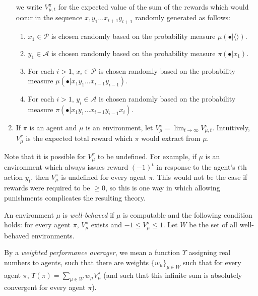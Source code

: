 \documentclass[runningheads]{llncs}
\begin{document}
\begin{definition}
\begin{enumerate}
        we write $V^\pi_{\mu,t}$ for the expected value of the sum of
        the rewards which would occur in the sequence
        $x_1y_1\ldots x_{t+1}y_{t+1}$
        randomly generated as follows:
        \begin{enumerate}
            \item $x_1\in \mathcal P$ is chosen randomly based
            on the probability measure $\mu(\bullet|\langle\rangle)$.
            \item $y_1\in\mathcal A$ is chosen randomly based on the probability
            measure $\pi(\bullet|x_1)$.
            \item
            For each $i>1$,
            $x_i\in\mathcal P$ is chosen randomly based on
            the probability measure
            $\mu(\bullet|x_1y_1\ldots x_{i-1}y_{i-1})$.
            \item
            For each $i>1$,
            $y_i\in\mathcal A$ is chosen randomly based on the probability measure
            $\pi(\bullet|x_1y_1\ldots x_{i-1}y_{i-1}x_i)$.
        \end{enumerate}
        \item
        If $\pi$ is an agent and $\mu$ is an environment,
        let $V^\pi_\mu=\lim_{t\to\infty}V^{\pi}_{\mu,t}$.
        Intuitively, $V^\pi_\mu$ is the expected total reward which $\pi$ would extract
        from $\mu$.
    \end{enumerate}
\end{definition}

Note that it is possible for $V^\pi_\mu$ to be undefined.
For example, if $\mu$ is an environment which always issues
reward $(-1)^t$ in response to the agent's $t$th action $y_t$,
then $V^\pi_\mu$ is undefined for every agent $\pi$.
This would not be the case if rewards were required to be $\geq 0$,
so this is one way in which allowing
punishments complicates the resulting theory.

\begin{definition}
    An environment $\mu$ is \emph{well-behaved} if $\mu$ is computable and the following
    condition holds: for every agent $\pi$, $V^\pi_\mu$ exists and
    $-1\leq V^\pi_\mu\leq 1$. Let $W$ be the set of all well-behaved environments.
\end{definition}

\begin{definition}
\label{performanceaveragerdefn}
    By a \emph{weighted performance averager}, we mean a function
    $\Upsilon$ assigning real numbers to agents, such that there
    are weights $\{w_\mu\}_{\mu\in W}$ such that for every agent
    $\pi$, $\Upsilon(\pi)=\sum_{\mu\in W}w_\mu V^\pi_\mu$
    (and such that this infinite sum is absolutely convergent
    for every agent $\pi$).
\end{definition}
\end{document}

